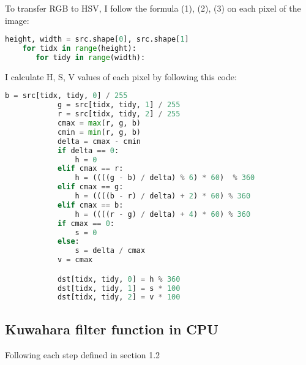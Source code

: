 \documentclass{article}
\begin{document}
To transfer RGB to HSV, I follow the formula (1), (2), (3) on each pixel of the image:
\begin{lstlisting}[language=Python]
    height, width = src.shape[0], src.shape[1]
    for tidx in range(height):
       for tidy in range(width):
\end{lstlisting}
I calculate H, S, V values of each pixel by following this code:
\begin{lstlisting}[language=Python]
            b = src[tidx, tidy, 0] / 255
            g = src[tidx, tidy, 1] / 255
            r = src[tidx, tidy, 2] / 255
            cmax = max(r, g, b)
            cmin = min(r, g, b)
            delta = cmax - cmin
            if delta == 0:
                h = 0
            elif cmax == r:
                h = ((((g - b) / delta) % 6) * 60)  % 360
            elif cmax == g:
                h = ((((b - r) / delta) + 2) * 60) % 360
            elif cmax == b:
                h = ((((r - g) / delta) + 4) * 60) % 360
            if cmax == 0:
                s = 0
            else:
                s = delta / cmax
            v = cmax

            dst[tidx, tidy, 0] = h % 360
            dst[tidx, tidy, 1] = s * 100
            dst[tidx, tidy, 2] = v * 100
\end{lstlisting}

\subsection{Kuwahara filter function in CPU}
Following each step defined in section 1.2
\end{document}
